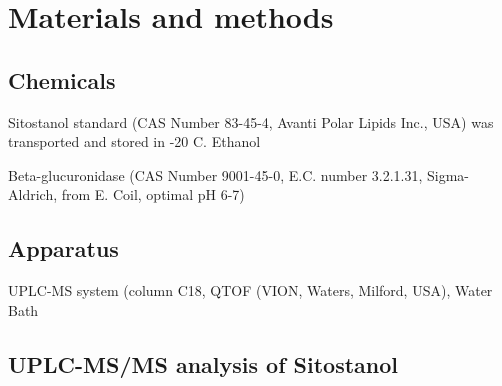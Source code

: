 \section{Materials and methods}
\subsection{Chemicals}
Sitostanol standard (CAS Number 83-45-4, Avanti Polar Lipids Inc., USA) was transported and stored in -20 \degree C. Ethanol

Beta-glucuronidase (CAS Number 9001-45-0, E.C. number 3.2.1.31, Sigma-Aldrich, from E. Coil, optimal pH 6-7)

\subsection{Apparatus}
UPLC-MS system (column C18, QTOF (VION, Waters, Milford, USA), Water Bath


\subsection{UPLC-MS/MS analysis of Sitostanol}

